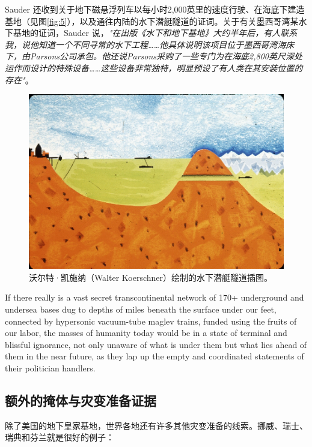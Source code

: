 \documentclass[10pt,twocolumn,letterpaper]{article}
\begin{document}
Sauder 还收到关于地下磁悬浮列车以每小时2,000英里的速度行驶、在海底下建造基地（见图\ref{fig:5}），以及通往内陆的水下潜艇隧道的证词。关于有关墨西哥湾某水下基地的证词，Sauder 说，\textit{"在出版《水下和地下基地》大约半年后，有人联系我，说他知道一个不同寻常的水下工程……他具体说明该项目位于墨西哥湾海床下，由Parsons公司承包。他还说Parsons采购了一些专门为在海底2,800英尺深处运作而设计的特殊设备……这些设备非常独特，明显预设了有人类在其安装位置的存在"}\cite{22}。

\begin{figure}[t]
\begin{center}
   \includegraphics[width=1\linewidth]{sub.jpg}
\end{center}
   \caption{沃尔特·凯施纳（Walter Koerschner）绘制的水下潜艇隧道插图\cite{22,23}。}
\label{fig:6}
\label{fig:onecol}
\end{figure}
If there really is a vast secret transcontinental network of 170+ underground and undersea bases dug to depths of miles beneath the surface under our feet, connected by hypersonic vacuum-tube maglev trains, funded using the fruits of our labor, the masses of humanity today would be in a state of terminal and blissful ignorance, not only unaware of what is under them but what lies ahead of them in the near future, as they lap up the empty and coordinated statements of their politician handlers.

\subsection{额外的掩体与灾变准备证据}

除了美国的地下皇家基地，世界各地还有许多其他灾变准备的线索。挪威、瑞士、瑞典和芬兰就是很好的例子：
\end{document}
